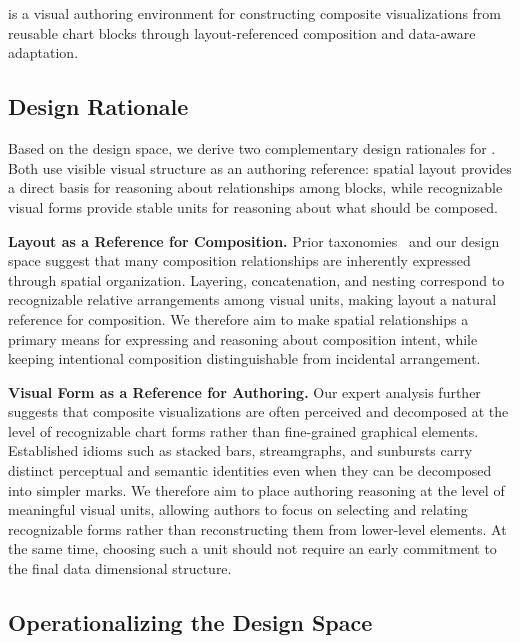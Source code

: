 \section{\system}
\label{sec:system}

{\system} is a visual authoring environment for constructing composite
visualizations from reusable chart blocks through layout-referenced
composition and data-aware adaptation.


\subsection{Design Rationale}
\label{sec:design-rationale}

Based on the design space, we derive two complementary design rationales for
{\system}. Both use visible visual structure as an authoring reference:
spatial layout provides a direct basis for reasoning about relationships among
blocks, while recognizable visual forms provide stable units for reasoning
about what should be composed.

\textbf{Layout as a Reference for Composition.}
Prior taxonomies~\cite{javed2012exploring,Composite,vaid} and our design space suggest that many
composition relationships are inherently expressed through spatial
organization. Layering, concatenation, and nesting correspond to recognizable
relative arrangements among visual units, making layout a natural reference
for composition. We therefore aim to make spatial relationships a primary
means for expressing and reasoning about composition intent, while keeping
intentional composition distinguishable from incidental arrangement.

\textbf{Visual Form as a Reference for Authoring.}
Our expert analysis further suggests that composite visualizations are often
perceived and decomposed at the level of recognizable chart forms rather than
fine-grained graphical elements. Established idioms such as stacked bars,
streamgraphs, and sunbursts carry distinct perceptual and semantic identities
even when they can be decomposed into simpler marks. We therefore aim to place
authoring reasoning at the level of meaningful visual units, allowing authors
to focus on selecting and relating recognizable forms rather than reconstructing
them from lower-level elements. At the same time, choosing such a unit should
not require an early commitment to the final data dimensional structure.



\subsection{Operationalizing the Design Space}

